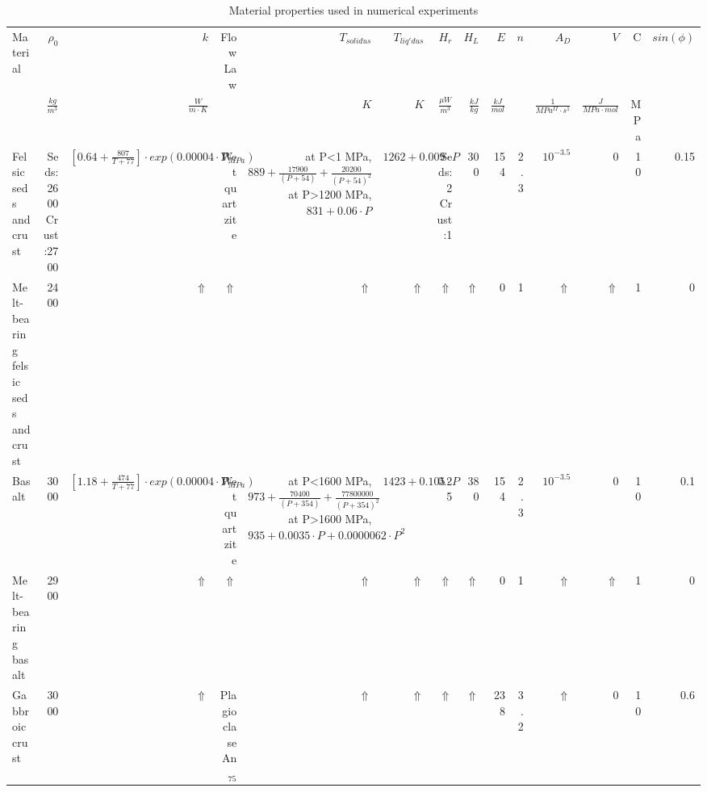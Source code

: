 \documentclass{article}
\begin{document}
	
\begin{table}
	\begin{threeparttable}
		\captionsetup{labelformat=empty}
		\caption{Material properties used in numerical experiments}
	\tiny
	\setlength{\tabcolsep}{4pt}
	\begin{tabularx}{\textwidth}{L{1} R{1} R{2} R{1} R{3} R{1} R{0.75} R{0.5} R{0.5} R{0.25} R{1} R{1} R{0.5} R{0.5}}
		
		\toprule
		
		Material & $\rho_0$ & $k$ & Flow Law & $T_{solidus}$ & $T_{liq'dus}$ & $H_r$ & $H_L$ & $E$ & $n$ & $A_D$ & $V$ & C & $sin(\phi)$ \\
		& $\frac{kg}{m^3}$ & $\frac{W}{m\cdot K}$ & & $K$ & $K$ & $\frac{\mu W}{m^3}$ & $\frac{kJ}{kg}$ & $\frac{kJ}{mol}$ & & $\frac{1}{MPa^{II}\cdot s^{1}}$ & $\frac{J}{MPa\cdot mol}$ & MPa & \\
		
		\midrule
		
		Felsic seds and crust & Seds:2600 Crust:2700 & $[0.64+\frac{807}{T+77}]\cdot exp(\num{0.00004}\cdot P_{MPa})$ & Wet quartzite & at P<1 MPa, $889+\frac{\num{17900}}{(P+54)}+\frac{\num{20200}}{(P+54)^2}$ at P>1200 MPa, $831+0.06\cdot P$ & $1262+0.009\cdot P$ & Seds:2 Crust:1 & 300 & 154 & 2.3 & $10^{-3.5}$ & 0 & 10 & 0.15 \\
		
		Melt-bearing felsic seds and crust & 2400 & $\Uparrow$ & $\Uparrow$ & $\Uparrow$ & $\Uparrow$ & $\Uparrow$ & $\Uparrow$ & 0 & 1 & $\Uparrow$ & $\Uparrow$ & 1 & 0 \\
		
		Basalt & 3000 & $[1.18+\frac{474}{T+77}]\cdot exp(\num{0.00004}\cdot P_{MPa})$ & Wet quartzite & at P<1600 MPa, $973+\frac{\num{70400}}{(P+354)}+\frac{\num{77800000}}{(P+354)^2}$ at P>1600 MPa, $935+0.0035\cdot P+\num{0.0000062}\cdot P^2$ & $1423+0.105\cdot P$ & 0.25 & 380 & 154 & 2.3 & $10^{-3.5}$ & 0 & 10 & 0.1 \\
		
		Melt-bearing basalt & 2900 & $\Uparrow$ & $\Uparrow$ & $\Uparrow$ & $\Uparrow$ & $\Uparrow$ & $\Uparrow$ & 0 & 1 & $\Uparrow$ & $\Uparrow$ & 1 & 0 \\
		
		Gabbroic crust & 3000 &  $\Uparrow$ & Plagioclase An$_{75}$ & $\Uparrow$ & $\Uparrow$ & $\Uparrow$ & $\Uparrow$ & 238 & 3.2 & $\Uparrow$ & 0 & 10 & 0.6 \\
		

\end{tabularx}
\end{threeparttable}
\end{table}
\end{document}

